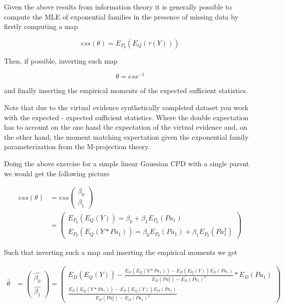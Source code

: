 \documentclass[11pt]{article}
\begin{document}
\begin{article}
Given the above results from information theory it is generally
possible to compute the MLE of exponential families in the presence
of missing data by firstly computing a map

$$ess(\theta) = E_{P_\theta}(E_Q(\tau(Y)))$$

Then, if possible, inverting such map

$$\theta = ess^{-1}$$

and finally inserting the empirical moments of the expected
sufficient statistics.

Note that due to the virtual evidence synthetically completed
dataset you work with the expected - expected sufficient
statistics. Where the double expectation has to account on the one
hand the expectation of the virtual evidence and, on the other
hand, the moment matching expectation given the exponential family
parameterization from the M-projection theory. 

Doing the above exercise for a simple linear Gaussian CPD with a
single parent we would get the following picture

 \begin{align*}
 ess (\theta) &= ess\begin{pmatrix}
                 \beta_0\\
		 \beta_1
		 \end{pmatrix} \\
		 &= \begin{pmatrix}
		 E_{P_\theta}(E_Q(Y)) = \beta_0 + \beta_1 E_{P_\theta}(Pa_1) \\
		 E_{P_\theta}(E_Q(Y * Pa_1)) = \beta_0 E_{P_\theta}(Pa_1) + \beta_1 E_{P_\theta}(Pa_1^2)
		 \end{pmatrix}
\end{align*}


Such that inverting such a map and inserting the empirical moments
we get

 \begin{align}
 \hat{\theta} &= \begin{pmatrix}
                 \hat{\beta_0}\\
		 \hat{\beta_1}
           \end{pmatrix} 
        = \begin{pmatrix}
		 E_D(E_Q(Y)) - \frac{E_D(E_Q(Y*Pa_1))- E_D(E_Q(Y))E_D(Pa_1)}{E_D(Pa_1^2) - E_D(Pa_1)^2} * E_D(Pa_1)\\
		 \frac{E_D(E_Q(Y*Pa_1))- E_D(E_Q(Y))E_D(Pa_1)}{E_D(Pa_1^2) - E_D(Pa_1)^2}
           \end{pmatrix}
\end{align}


\end{article}
\end{document}
